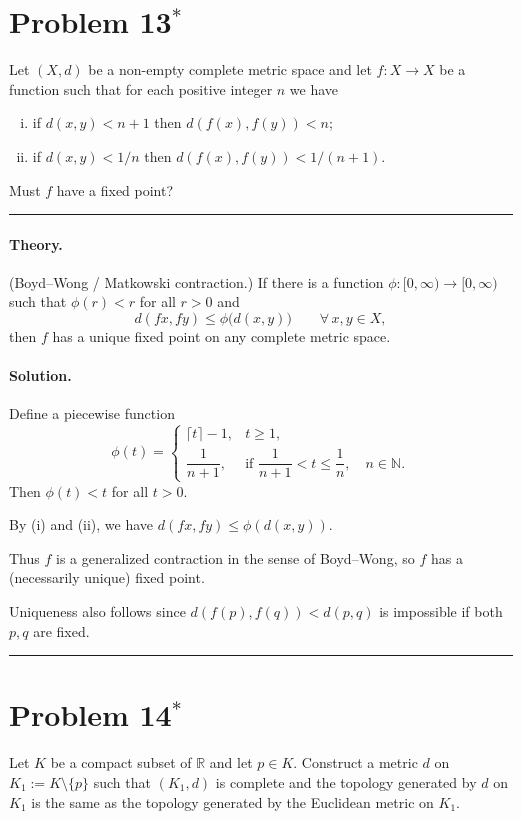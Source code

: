 \documentclass[12pt,a4paper]{article}
\theoremstyle{plain}
\theoremstyle{definition}
\theoremstyle{remark}
\theoremstyle{remark}
\begin{document}
\section*{Problem 13$^{\ast}$}
Let $(X,d)$ be a non-empty complete metric space and let $f:X\to X$ be a function such that
for each positive integer $n$ we have
\begin{enumerate}[(i)]
	\item if $d(x,y)<n+1$ then $d(f(x),f(y))<n$;
	\item if $d(x,y)<1/n$ then $d(f(x),f(y))<1/(n+1)$.
\end{enumerate}
Must $f$ have a fixed point?

\bigskip
\hrule
\bigskip

\paragraph{Theory.}
(Boyd--Wong / Matkowski contraction.)
If there is a function $\phi:[0,\infty)\to[0,\infty)$ such that
$\phi(r)<r$ for all $r>0$ and
\[
d(fx,fy)\le \phi\big(d(x,y)\big)\qquad\forall\,x,y\in X,
\]
then $f$ has a unique fixed point on any complete metric space.

\bigskip
\paragraph{Solution.}
Define a piecewise function
\[
\phi(t)=
\begin{cases}
	\lceil t\rceil - 1, & t\ge 1,\\[3pt]
	\dfrac{1}{n+1}, & \text{if } \dfrac{1}{n+1}<t\le \dfrac{1}{n},\quad n\in\mathbb N.
\end{cases}
\]
Then $\phi(t)<t$ for all $t>0$.  


By (i) and (ii), we have $d(fx,fy)\le \phi(d(x,y))$.


Thus $f$ is a generalized contraction in the sense of Boyd--Wong, so
$f$ has a (necessarily unique) fixed point.

Uniqueness also follows since
$d(f(p),f(q))<d(p,q)$ is impossible if both $p,q$ are fixed.

\bigskip
\hrule
\bigskip

\section*{Problem 14$^{\ast}$}
Let $K$ be a compact subset of $\mathbb{R}$ and let $p\in K$. Construct a metric $d$ on
$K_1:=K\setminus\{p\}$ such that $(K_1,d)$ is complete and the topology generated by $d$ on $K_1$
is the same as the topology generated by the Euclidean metric on $K_1$.
\end{document}
